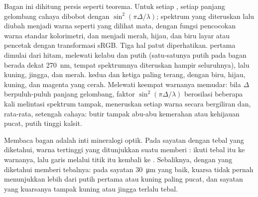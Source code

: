 Bagan ini dihitung persis seperti teorema. Untuk setiap , setiap panjang gelombang cahaya dibobot dengan $\sin^2(\pi\Delta/\lambda)$; spektrum yang diteruskan lalu diubah menjadi warna seperti yang dilihat mata, dengan fungsi pencocokan warna standar kolorimetri, dan menjadi merah, hijau, dan biru layar atau pencetak dengan transformasi sRGB. Tiga hal patut diperhatikan.  pertama dimulai dari hitam, melewati kelabu dan putih (satu-satunya putih pada bagan berada dekat \qty{270}{nm}, tempat spektrumnya diteruskan hampir seluruhnya), lalu kuning, jingga, dan merah.  kedua dan ketiga paling terang, dengan biru, hijau, kuning, dan magenta yang cerah. Melewati  keempat warnanya memudar: bila $\Delta$ berpuluh-puluh panjang gelombang, faktor $\sin^2(\pi\Delta/\lambda)$ berosilasi beberapa kali melintasi spektrum tampak, meneruskan setiap warna secara bergiliran dan, rata-rata, setengah cahaya: butir tampak abu-abu kemerahan atau kehijauan pucat, putih  tinggi kalsit.

Membaca bagan adalah inti mineralogi optik. Pada sayatan dengan tebal yang diketahui, warna tertinggi yang ditunjukkan suatu  memberi : ikuti tebal itu ke warnanya, lalu garis melalui titik itu kembali ke . Sebaliknya,  dengan  yang diketahui memberi tebalnya: pada sayatan \qty{30}{\micro m} yang baik, kuarsa tidak pernah menunjukkan lebih dari putih  pertama atau kuning paling pucat, dan sayatan yang kuarsanya tampak kuning atau jingga terlalu tebal.

